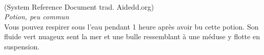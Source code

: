 \\
{\small (System Reference Document trad. Aidedd.org)}\\
{\small \it Potion, peu commun}\\
Vous pouvez respirer sous l'eau pendant 1 heure après avoir bu cette potion. Son fluide vert nuageux sent la mer et une bulle ressemblant à une méduse y flotte en suspension. \\

